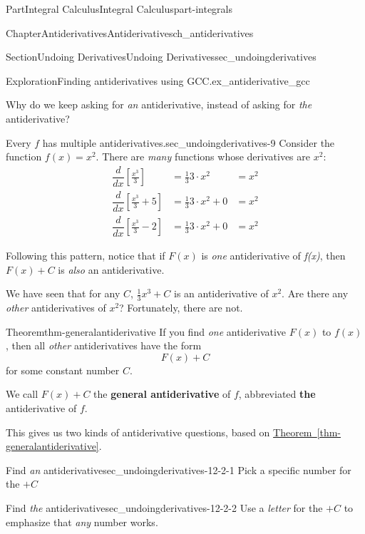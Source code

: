 \documentclass[oneside,10pt,]{tufte-book}
\newcommand{\xreffont}{\relax}
\newcommand{\terminology}[1]{\textbf{#1}}
\numberwithin{equation}{chapter}
\newcommand{\ddxfrac}[1]{ \dfrac{d}{dx} \left[ #1 \right]  }
\newcommand{\amp}{&}
\begin{document}
\begin{partptx}{Part}{Integral Calculus}{}{Integral Calculus}{}{}{part-integrals}
\begin{chapterptx}{Chapter}{Antiderivatives}{}{Antiderivatives}{}{}{ch_antiderivatives}
\begin{sectionptx}{Section}{Undoing Derivatives}{}{Undoing Derivatives}{}{}{sec_undoingderivatives}
\begin{exploration}{Exploration}{Finding antiderivatives using GCC.}{ex_antiderivative_gcc}
\begin{enumerate}[font=\bfseries,label=(\alph*),ref=\alph*]
\begin{descriptionlist}
\end{descriptionlist}
%
\end{enumerate}%
\end{exploration}%
Why do we keep asking for \emph{an} antiderivative, instead of asking for \emph{the} antiderivative?%
\begin{paragraphs}{Every \(f\) has multiple antiderivatives.}{sec_undoingderivatives-9}%
Consider the function \(f(x)=x^2\). There are \emph{many} functions whose derivatives are \(x^2\):%
\begin{align*}
\ddxfrac{\frac{x^3}{3} } \amp = \frac{1}{3}3\cdot x^2 \amp =  x^2 \\
\ddxfrac{\frac{x^3}{3} + 5 } \amp = \frac{1}{3}3\cdot x^2 + 0 \amp =  x^2 \\
\ddxfrac{\frac{x^3}{3} - 2 } \amp = \frac{1}{3}3\cdot x^2 + 0 \amp =  x^2 
\end{align*}
%
\par
Following this pattern, notice that if \(F(x)\) is \emph{one} antiderivative of \emph{f(x)}, then \(F(x)+C \) is \emph{also} an antiderivative.%
\end{paragraphs}%
\par\medskip
We have seen that for any \(C\), \(\frac{1}{3}x^3+C\) is an antiderivative of \(x^2\). Are there any \emph{other} antiderivatives of \(x^2\)?  Fortunately, there are not.%
\begin{theorem}{Theorem}{}{}{thm-generalantiderivative}%
If you find \emph{one} antiderivative \(F(x)\) to \(f(x)\), then all \emph{other} antiderivatives have the form%
\begin{equation*}
F(x) + C
\end{equation*}
for some constant number \(C\).%
\par
We call \(F(x)+C\) the \terminology{general antiderivative} of \(f\), abbreviated \terminology{the} antiderivative of \(f\).%
\end{theorem}
This gives us two kinds of antiderivative questions, based on \hyperref[thm-generalantiderivative]{Theorem~{\xreffont\ref{thm-generalantiderivative}}}.%
\begin{descriptionlist}
\begin{dlimedium}{Find \emph{an} antiderivative}{sec_undoingderivatives-12-2-1}%
Pick a specific number for the \(+C\)%
\end{dlimedium}%
\begin{dlimedium}{Find \emph{the} antiderivative}{sec_undoingderivatives-12-2-2}%
Use a \emph{letter} for the \(+C\) to emphasize that \emph{any} number works.%

\end{dlimedium}
\end{descriptionlist}
\end{sectionptx}
\end{chapterptx}
\end{partptx}
\end{document}
